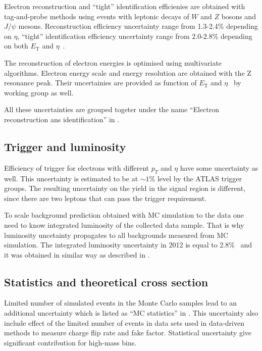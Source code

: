 Electron reconstruction and ``tight'' identification efficienies are obtained with tag-and-probe methods using
events with leptonic decays of $W$ and $Z$ bosons and $J/\psi$ mesons.
Reconstruction efficiency uncertainty range from 1.3-2.4\% depending on $\eta$, 
``tight'' identification efficiency uncertainty range from 2.0-2.8\% depending on both $E_\mathrm{T}$ and $\eta$~\cite{electron_reco_id_2011}.

The reconstruction of electron energies is optimised using multivariate algorithms.
Electron energy scale and energy resolution are obtained with the Z resonance peak.
Their uncertainies are provided as function of $E_\mathrm{T}$ and $\eta$~\cite{electron_energy_errors_Run1} 
by working group as well.

All these uncertainties are grouped togeter under the name ``Electron reconstruction ans identification'' in .

\subsection{Trigger and luminosity}
Efficiency of trigger for electrons with different $p_T$ and $\eta$ have some uncertainty as well.
This uncertainty is estimated to be at $\sim1\%$ level by the ATLAS trigger groups.
The resulting uncertainty on the yield in the signal region is different, since there are two leptons that can pass the trigger requirement. 

To scale background prediction obtained with MC simulation to the data 
one need to know integrated luminosity of the collected data sample. 
That is why luminosity uncetainty propagates to all backgrounds measured from MC simulation.
The integrated luminosity uncertainty in 2012 is equal to 2.8$\%$~\cite{Aad:2013ucp} 
and it was obtained in similar way as described in .

\subsection{Statistics and theoretical cross section}
Limited number of simulated events in the Monte Carlo samples lead to an additional uncertainty which is listed as ``MC statistics'' in .
This uncertainty also include effect of the limited number of events in data sets used in data-driven methods to measure charge flip rate and fake factor.
Statistical uncertainty give significant contribution for high-mass bins.

